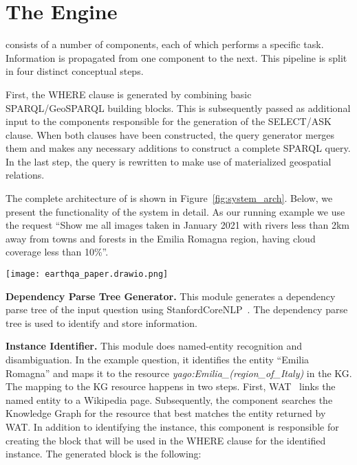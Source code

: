 \section{The \EngineName{} Engine}
\label{sec:engine}

\EngineName{} %
consists of a number of components, each of which performs a specific task. Information is propagated from one component to the next. This pipeline is split in four distinct conceptual steps.


First, the WHERE clause is generated by combining basic SPARQL/GeoSPARQL building blocks. This is subsequently passed as additional input to the components responsible for the generation of the SELECT/ASK clause. When both clauses have been constructed, the query generator merges them and makes any necessary additions to construct a complete SPARQL query. In the last step, the query is rewritten to make use of materialized geospatial relations.

The complete architecture of \EngineName{} is shown in Figure~\ref{fig:system_arch}. Below, we present the functionality of the system in detail. As our running example we use the request ``Show me all images taken in January 2021 with rivers less than 2km away from towns and forests in the Emilia Romagna region, having cloud coverage less than 10\%''.

\begin{figure*}[h]
\begin{center}
\texttt{[image: earthqa\_paper.drawio.png]}
\end{center}
\caption{The conceptual architecture of the \EngineName{} system}
\label{fig:system_arch}
\end{figure*} 

\textbf{Dependency Parse Tree Generator.} This module generates a dependency parse tree of the input question using StanfordCoreNLP~\cite{corenlp}. The dependency parse tree is used to identify and store information.

\textbf{Instance Identifier.} This module does named-entity recognition and disambiguation.
In the example question, it identifies the entity “Emilia Romagna” and maps it to the resource \textit{yago:Emilia\_(region\_of\_Italy)} in the KG. The mapping to the KG resource happens in two steps. First, WAT~\cite{WAT} links the named entity to a Wikipedia page. Subsequently, the component searches the Knowledge Graph for the resource that best matches the entity returned by WAT.
In addition to identifying the instance, this component is responsible for creating the block that will be used in the WHERE clause for the identified instance. The generated block is the following:

